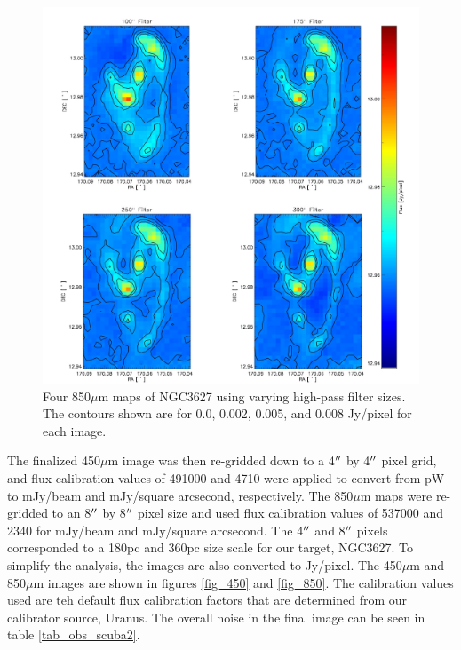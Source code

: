 \begin{figure}
  \centering
  \includegraphics[scale=0.5]{obs_imgs/850_comparison_4.jpeg}
  \caption[850$\mu$m High-Pass Filter Images]{Four 850$\mu$m maps of NGC3627 using varying high-pass filter sizes.  The contours shown are for 0.0, 0.002, 0.005, and 0.008 Jy/pixel for each image.}
    \label{850_flt}
\end{figure}

The finalized 450$\mu$m image was then re-gridded down to a 4$\mbox{$^{\prime\prime}$}$ by 4$\mbox{$^{\prime\prime}$}$ pixel grid, and flux calibration values of 491000 and 4710 were applied to convert from pW to mJy/beam and mJy/square arcsecond, respectively.  The 850$\mu$m maps were re-gridded to an 8$\mbox{$^{\prime\prime}$}$ by 8$\mbox{$^{\prime\prime}$}$ pixel size and used flux calibration values of 537000 and 2340 for mJy/beam and mJy/square arcsecond.  The 4$\mbox{$^{\prime\prime}$}$ and 8$\mbox{$^{\prime\prime}$}$ pixels corresponded to a 180pc and 360pc size scale for our target, NGC3627.  To simplify the analysis, the images are also converted to Jy/pixel.  The 450$\mu$m and 850$\mu$m images are shown in figures \ref{fig_450} and \ref{fig_850}.  The calibration values used are teh default flux calibration factors that are determined from our calibrator source, Uranus.  The overall noise in the final image can be seen in table \ref{tab_obs_scuba2}.


